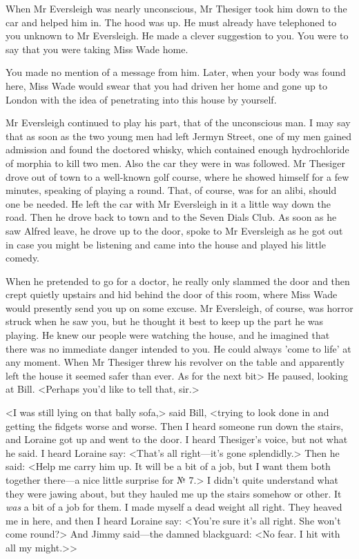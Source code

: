 When Mr Eversleigh was nearly unconscious, Mr Thesiger took him down to the car and helped him in. The hood was up. He must already have telephoned to you unknown to Mr Eversleigh. He made a clever suggestion to you. You were to say that you were taking Miss Wade home.

You made no mention of a message from him. Later, when your body was found here, Miss Wade would swear that you had driven her home and gone up to London with the idea of penetrating into this house by yourself.

Mr Eversleigh continued to play his part, that of the unconscious man. I may say that as soon as the two young men had left Jermyn Street, one of my men gained admission and found the doctored whisky, which contained enough hydrochloride of morphia to kill two men. Also the car they were in was followed. Mr Thesiger drove out of town to a well-known golf course, where he showed himself for a few minutes, speaking of playing a round. That, of course, was for an alibi, should one be needed. He left the car with Mr Eversleigh in it a little way down the road. Then he drove back to town and to the Seven Dials Club. As soon as he saw Alfred leave, he drove up to the door, spoke to Mr Eversleigh as he got out in case you might be listening and came into the house and played his little comedy.

When he pretended to go for a doctor, he really only slammed the door and then crept quietly upstairs and hid behind the door of this room, where Miss Wade would presently send you up on some excuse. Mr Eversleigh, of course, was horror struck when he saw you, but he thought it best to keep up the part he was playing. He knew our people were watching the house, and he imagined that there was no immediate danger intended to you. He could always 'come to life' at any moment. When Mr Thesiger threw his revolver on the table and apparently left the house it seemed safer than ever. As for the next bit\longdash> He paused, looking at Bill. <Perhaps you'd like to tell that, sir.>

<I was still lying on that bally sofa,> said Bill, <trying to look done in and getting the fidgets worse and worse. Then I heard someone run down the stairs, and Loraine got up and went to the door. I heard Thesiger's voice, but not what he said. I heard Loraine say: <That's all right—it's gone splendidly.> Then he said: <Help me carry him up. It will be a bit of a job, but I want them both together there—a nice little surprise for № 7.> I didn't quite understand what they were jawing about, but they hauled me up the stairs somehow or other. It \emph{was} a bit of a job for them. I made myself a dead weight all right. They heaved me in here, and then I heard Loraine say: <You're sure it's all right. She won't come round?> And Jimmy said—the damned blackguard: <No fear. I hit with all my might.>>

